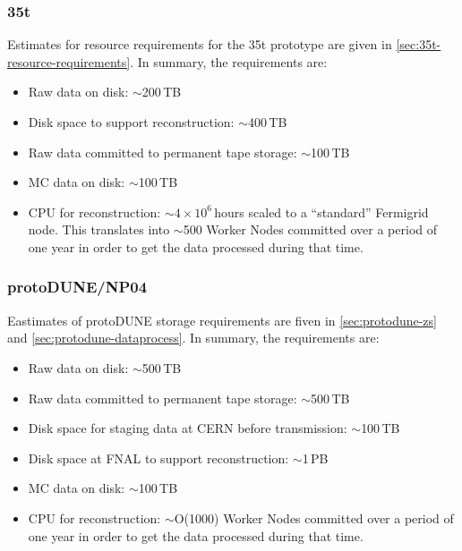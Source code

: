 \subsubsection{35t}
Estimates for resource requirements for the 35t prototype are given in \ref{sec:35t-resource-requirements}.
In summary, the requirements are:
\begin{itemize}

\item Raw data on disk: $\sim$200\,TB

\item Disk space to support reconstruction: $\sim$400\,TB

\item Raw data committed to permanent tape storage: $\sim$100\,TB

\item MC data on disk: $\sim$100\,TB

\item CPU for reconstruction: $\sim4\times10^6$\,hours scaled to a ``standard'' Fermigrid node. This translates into $\sim$500 Worker Nodes
committed over a period of one year in order to get the data processed during that time.

\end{itemize}

\subsubsection{protoDUNE/NP04}
Eastimates of protoDUNE storage requirements are fiven in \ref{sec:protodune-zs} and \ref{sec:protodune-dataprocess}.
In summary, the requirements are:
\begin{itemize}

\item Raw data on disk: $\sim$500\,TB

\item Raw data committed to permanent tape storage: $\sim$500\,TB

\item Disk space for staging data at CERN before transmission: $\sim$100\,TB

\item Disk space at FNAL to support reconstruction: $\sim$1\,PB

\item MC data on disk: $\sim$100\,TB

\item CPU for reconstruction: $\sim$O(1000) Worker Nodes
committed over a period of one year in order to get the data processed during that time.

\end{itemize}

